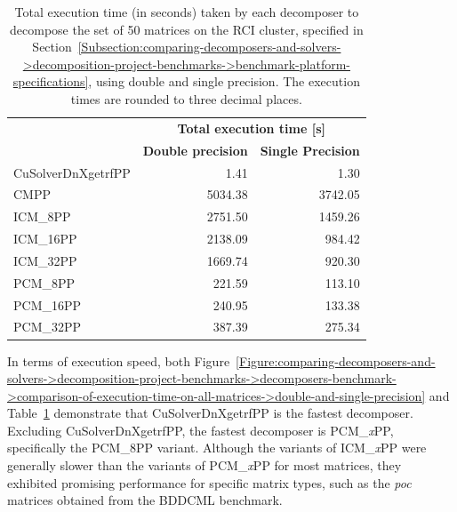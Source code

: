 \begin{table}[ht!]
	\centering
	\begin{tabular}{|l|r|r|}
		\hline
		\rowcolor[HTML]{C0C0C0} 
		\multicolumn{1}{|c|}{\cellcolor[HTML]{C0C0C0}}                                      & \multicolumn{2}{c|}{\cellcolor[HTML]{C0C0C0}\textbf{Total execution time {[}s{]}}}                                                                        \\ \cline{2-3} 
		\rowcolor[HTML]{EFEFEF} 
		\multicolumn{1}{|c|}{\multirow{-2}{*}{\cellcolor[HTML]{C0C0C0}\textbf{Decomposer}}} & \multicolumn{1}{l|}{\cellcolor[HTML]{EFEFEF}\textbf{Double precision}} & \multicolumn{1}{l|}{\cellcolor[HTML]{EFEFEF}\textbf{Single Precision}} \\ \hline
		\multicolumn{1}{|l|}{CuSolverDnXgetrfPP} &    1.41 &    1.30 \\
		\multicolumn{1}{|l|}{CMPP}               & 5034.38 & 3742.05 \\
		\multicolumn{1}{|l|}{ICM\_8PP}           & 2751.50 & 1459.26 \\
		\multicolumn{1}{|l|}{ICM\_16PP}          & 2138.09 &  984.42 \\
		\multicolumn{1}{|l|}{ICM\_32PP}          & 1669.74 &  920.30 \\
		\multicolumn{1}{|l|}{PCM\_8PP}           &  221.59 &  113.10 \\
		\multicolumn{1}{|l|}{PCM\_16PP}          &  240.95 &  133.38 \\
		\multicolumn{1}{|l|}{PCM\_32PP}          &  387.39 &  275.34 \\ \hline
	\end{tabular}
	\caption{Total execution time (in seconds) taken by each decomposer to decompose the set of 50 matrices on the RCI cluster, specified in Section~\ref{Subsection:comparing-decomposers-and-solvers->decomposition-project-benchmarks->benchmark-platform-specifications}, using double and single precision.
		The execution times are rounded to three decimal places.}
	\label{Table:comparing-decomposers-and-solvers->decomposition-project-benchmarks->decomposers-benchmark->comparison-of-execution-time-on-all-matrices->total-execution-of-decomposers-on-set-of-50-matrices}
\end{table}

In terms of execution speed, both Figure~\ref{Figure:comparing-decomposers-and-solvers->decomposition-project-benchmarks->decomposers-benchmark->comparison-of-execution-time-on-all-matrices->double-and-single-precision} and Table~\ref{Table:comparing-decomposers-and-solvers->decomposition-project-benchmarks->decomposers-benchmark->comparison-of-execution-time-on-all-matrices->total-execution-of-decomposers-on-set-of-50-matrices} demonstrate that CuSolverDnXgetrfPP is the fastest decomposer.
Excluding CuSolverDnXgetrfPP, the fastest decomposer is PCM\_\textit{x}PP, specifically the PCM\_8PP variant.
Although the variants of ICM\_\textit{x}PP were generally slower than the variants of PCM\_\textit{x}PP for most matrices, they exhibited promising performance for specific matrix types, such as the \textit{poc} matrices obtained from the BDDCML benchmark.


